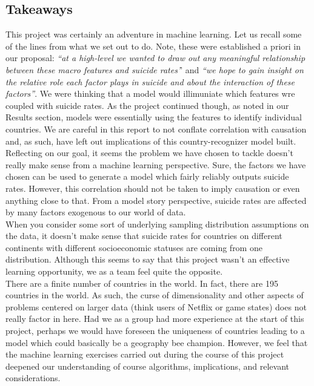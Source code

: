 \documentclass{article}
\begin{document}
\begin{multicols}{2}
\subsection{Takeaways}
This project was certainly an adventure in machine learning. Let us recall some of the lines from what we set out to do. Note, these were established a priori in our proposal: \textit{``at a high-level we wanted to draw out any meaningful relationship between these macro features and suicide rates'}' and \textit{``we hope to gain insight on the
relative role each factor plays in suicide and about the interaction of these factors''}. We were thinking that a model would illimuniate which features wre coupled with suicide rates. As the project continued though, as noted in our Results section, models were essentially using the features to identify individual countries. We are careful in this report to not conflate correlation with causation and, as such, have left out implications of this country-recognizer model built. \\
Reflecting on our goal, it seems the problem we have chosen to tackle doesn't really make sense from a machine learning perspective. Sure, the factors we have chosen can be used to generate a model which fairly reliably outputs suicide rates. However, this correlation should not be taken to imply causation or even anything close to that. From a model story perspective, suicide rates are affected by many factors exogenous to our world of data. \\
When you consider some sort of underlying sampling distribution assumptions on the data, it doesn't make sense that suicide rates for countries on different continents with different socioeconomic statuses are coming from one distribution. Although this seems to say that this project wasn't an effective learning opportunity, we as a team feel quite the opposite. \\
There are a finite number of countries in the world. In fact, there are 195 countries in the world. As such, the curse of dimensionality and other aspects of problems centered on larger data (think users of Netflix or game states) does not really factor in here. Had we as a group had more experience at the start of this project, perhaps we would have foreseen the uniqueness of countries leading to a model which could basically be a geography bee champion. However, we feel that the machine learning exercises carried out during the course of this project deepened our understanding of course algorithms, implications, and relevant considerations.





\end{multicols}
\end{document}
